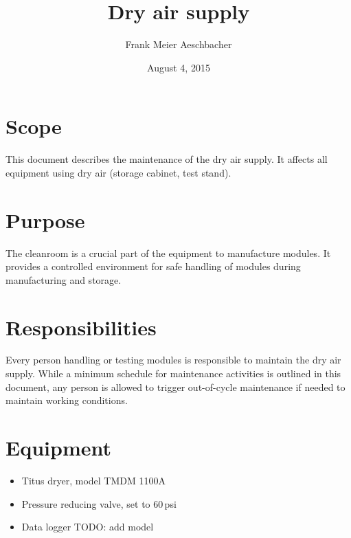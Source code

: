 \documentclass[12pt]{unlsilabsop}
\title{Dry air supply}
\date{August 4, 2015}
\author{Frank Meier Aeschbacher}
\begin{document}
\maketitle

\section{Scope}
This document describes the maintenance of the dry air supply. It affects all equipment using dry air (storage cabinet, test stand).

\section{Purpose}
The cleanroom is a crucial part of the equipment to manufacture modules. It provides a controlled environment for safe handling of modules during manufacturing and storage.


\section{Responsibilities}
Every person handling or testing modules is responsible to maintain the dry air supply. While a minimum schedule for maintenance activities is outlined in this document, any person is allowed to trigger out-of-cycle maintenance if needed to maintain working conditions.

\section{Equipment}

\begin{itemize}
    \item Titus dryer, model TMDM 1100A
    \item Pressure reducing valve, set to 60\,psi
    \item Data logger TODO: add model
\end{itemize}
\end{document}
